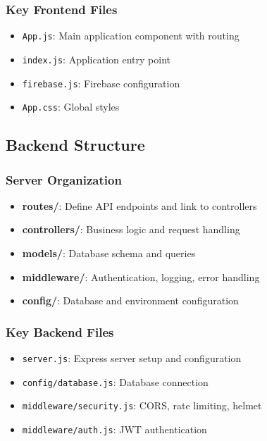 \documentclass[12pt,a4paper]{report}
\begin{document}
\subsubsection*{Key Frontend Files}
\begin{itemize}
    \item \texttt{App.js}: Main application component with routing
    \item \texttt{index.js}: Application entry point
    \item \texttt{firebase.js}: Firebase configuration
    \item \texttt{App.css}: Global styles
\end{itemize}

\subsection*{Backend Structure}

\subsubsection*{Server Organization}
\begin{itemize}
    \item \textbf{routes/}: Define API endpoints and link to controllers
    \item \textbf{controllers/}: Business logic and request handling
    \item \textbf{models/}: Database schema and queries
    \item \textbf{middleware/}: Authentication, logging, error handling
    \item \textbf{config/}: Database and environment configuration
\end{itemize}

\subsubsection*{Key Backend Files}
\begin{itemize}
    \item \texttt{server.js}: Express server setup and configuration
    \item \texttt{config/database.js}: Database connection
    \item \texttt{middleware/security.js}: CORS, rate limiting, helmet
    \item \texttt{middleware/auth.js}: JWT authentication
\end{itemize}
\end{document}
